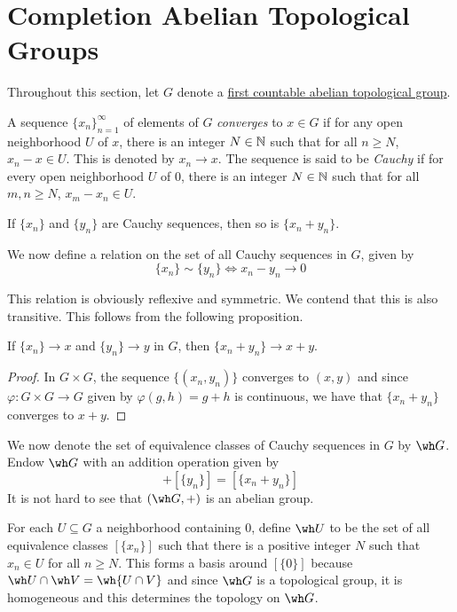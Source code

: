 \section{Completion Abelian Topological Groups}
Throughout this section, let $G$ denote a \underline{first countable abelian topological group}.

\begin{definition}
    A sequence $\{x_n\}_{n = 1}^\infty$ of elements of $G$ \textit{converges} to $x\in G$ if for any open neighborhood $U$ of $x$, there is an integer $N\in\mathbb{N}$ such that for all $n\ge N$, $x_n - x\in U$. This is denoted by $x_n\to x$. The sequence is said to be \textit{Cauchy} if for every open neighborhood $U$ of $0$, there is an integer $N\in\mathbb{N}$ such that for all $m,n\ge N$, $x_m - x_n\in U$.
\end{definition}

\begin{proposition}
    If $\{x_n\}$ and $\{y_n\}$ are Cauchy sequences, then so is $\{x_n + y_n\}$.
\end{proposition}

We now define a relation on the set of all Cauchy sequences in $G$, given by 
\begin{equation*}
    \{x_n\}\sim\{y_n\}\iff x_n - y_n\to 0
\end{equation*}

This relation is obviously reflexive and symmetric. We contend that this is also transitive. This follows from the following proposition.

\begin{proposition}
    If $\{x_n\}\to x$ and $\{y_n\}\to y$ in $G$, then $\{x_n + y_n\}\to x + y$.
\end{proposition}
\begin{proof}
    In $G\times G$, the sequence $\{(x_n, y_n)\}$ converges to $(x, y)$ and since $\varphi: G\times G\to G$ given by $\varphi(g,h) = g + h$ is continuous, we have that $\{x_n + y_n\}$ converges to $x + y$.
\end{proof}

We now denote the set of equivalence classes of Cauchy sequences in $G$ by $\wh G$. Endow $\wh G$ with an addition operation given by 
\begin{equation*}
    [\{x_n\}] + [\{y_n\}] = [\{x_n + y_n\}]
\end{equation*}
It is not hard to see that $(\wh G, +)$ is an abelian group. 

For each $U\subseteq G$ a neighborhood containing $0$, define $\wh U$ to be the set of all equivalence classes $[\{x_n\}]$ such that there is a positive integer $N$ such that $x_n\in U$ for all $n\ge N$. This forms a basis around $[\{0\}]$ because $\wh U\cap\wh V = \wh{U\cap V}$ and since $\wh G$ is a topological group, it is homogeneous and this determines the topology on $\wh G$. 

